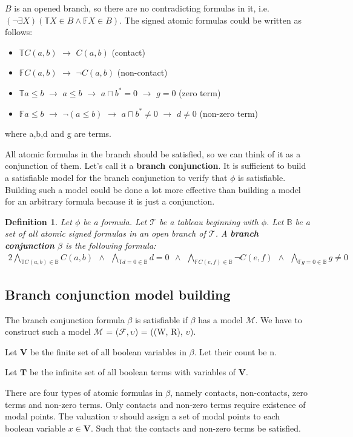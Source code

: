 \documentclass{article}
\newcommand\ST{\mathbb{T}}
\newcommand\SF{\mathbb{F}}
\newcommand\SB{\mathbb{B}}
\newcommand\M{\mathcal{M}}
\newcommand\F{\mathcal{F}}
\newcommand\Tb{\mathbf{T}}
\newcommand\Vb{\mathbf{V}}
\newtheorem{defn}[theorem]{Definition}
\newcommand{\BranchConjunction}{%
\begin{alignat}{2}
			\bigwedge_{\ST C(a,b)\in{\SB}} C(a, b) \:\: \wedge \:\:
			\bigwedge_{\ST d = 0\in{\SB}} d = 0 \:\: \wedge \:\:
			\bigwedge_{\SF C(e,f)\in{\SB}} \neg C(e, f) \:\: \wedge \:\:
			\bigwedge_{\SF g = 0\in{\SB}} g \neq 0
\end{alignat}%
}
\begin{document}
		\noindent $B$ is an opened branch, so there are no contradicting formulas in it, i.e. $(\neg \exists X)(\ST X \in B \land \SF X \in B)$.
		The signed atomic formulas could be written as follows:
		\begin{itemize}
			\item $\ST C(a,b)$ $\rightarrow$ $C(a,b)$ (contact)
			\item $\SF C(a,b)$ $\rightarrow$ $\neg C(a,b)$ (non-contact)
			\item $\ST a \leq b$ $\rightarrow$ $a \leq b$ $\rightarrow$ $a \sqcap b^*=0$ $\rightarrow$ $g = 0$ (zero term)
			\item $\SF a \leq b$ $\rightarrow$ $\neg (a \leq b)$ $\rightarrow$ $a \sqcap b^* \neq 0$ $\rightarrow$ $d \neq 0$ (non-zero term)
		\end{itemize}
			\noindent where a,b,d and g are terms.

		All atomic formulas in the branch should be satisfied, so we can think of it as a conjunction of them. Let's call it a \textbf{branch conjunction}. It is sufficient to build a satisfiable model for the branch conjunction to verify that $\phi$ is satisfiable. Building  such a model could be done a lot more effective than building a model for an arbitrary formula because it is just a conjunction.
		\begin{defn}
			\label{branch-conjunction}
			Let $\phi$ be a formula. Let $\mathcal{T}$ be a tableau beginning with $\phi$. Let $\SB$ be a set of all atomic signed formulas in an open branch of $\mathcal{T}$.	A \textbf{branch conjunction} $\beta$ is the following formula:
		 \BranchConjunction
		\end{defn}

	\subsection{Branch conjunction model building}
		The branch conjunction formula $\beta$ is satisfiable if $\beta$ has a model $\M$. We have to construct such a model $\M$ = ($\F, \upsilon$) = ((W, R), $\upsilon$).

		Let $\Vb$ be the finite set of all boolean variables in $\beta$. Let their count be n.

		Let $\Tb$ be the infinite set of all boolean terms with variables of $\Vb$.

		There are four types of atomic formulas in $\beta$, namely contacts, non-contacts, zero terms and non-zero terms. Only contacts and non-zero terms require existence of modal points. The valuation $\upsilon$ should assign a set of modal points to each boolean variable $x \in \Vb$. Such that the contacts and non-zero terms be satisfied.
\end{document}
